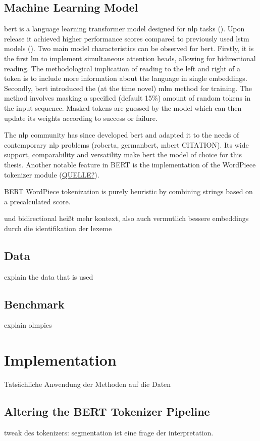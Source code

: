 \documentclass[english]{ttlab-qualify}
\begin{document}
    \subsection{Machine Learning Model}
    \label{subsec:mlm}
    \ac{bert} is a language learning transformer model designed for \ac{nlp} tasks (\cite{ATTENTION}).
    Upon release it achieved higher performance scores compared to previously used \ac{lstm} models (\cite{BERTHIGH1}).
    Two main model characteristics can be observed for \ac{bert}.
    Firstly, it is the first \ac{lm} to implement simultaneous attention heads, allowing for bidirectional reading.
    The methodological implication of reading to the left and right of a token is to include more information about the language in single embeddings.
    Secondly, \ac{bert} introduced the (at the time novel) \ac{mlm} method for training.
    The method involves masking a specified (default 15\%) amount of random tokens in the input sequence.
    Masked tokens are guessed by the model which can then update its weights according to success or failure.

    The \ac{nlp} community has since developed \ac{bert} and adapted it to the needs of contemporary \ac{nlp} problems (roberta, germanbert, mbert \uppercase{citation}).
    Its wide support, comparability and versatility make \ac{bert} the model of choice for this thesis.
    Another notable feature in \uppercase{bert} is the implementation of the WordPiece tokenizer module (\uppercase{\href{https://huggingface.co/course/chapter6/6?fw=pt}{quelle?}}).

    BERT WordPiece tokenization is purely heuristic by combining strings based on a precalculated score.

    und bidirectional heißt mehr kontext, also auch vermutlich bessere embeddings durch die identifikation der lexeme
    \subsection{Data}
    explain the data that is used
    \subsection{Benchmark}
    explain olmpics

    \section{Implementation}
    Tatsächliche Anwendung der Methoden auf die Daten
    \subsection{Altering the BERT Tokenizer Pipeline}
    tweak des tokenizers: segmentation ist eine frage der interpretation.
\end{document}
